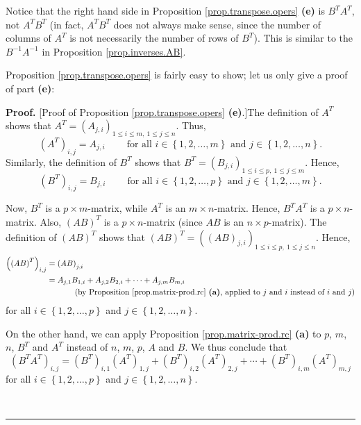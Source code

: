\documentclass[numbers=enddot,12pt,final,onecolumn,notitlepage]{scrartcl}%
\theoremstyle{definition}
\newenvironment{proof}[1][Proof]{\noindent\textbf{#1.} }{\ \rule{0.5em}{0.5em}}
\begin{document}
Notice that the right hand side in Proposition \ref{prop.transpose.opers}
\textbf{(e)} is $B^{T}A^{T}$, not $A^{T}B^{T}$ (in fact, $A^{T}B^{T}$ does not
always make sense, since the number of columns of $A^{T}$ is not necessarily
the number of rows of $B^{T}$). This is similar to the $B^{-1}A^{-1}$ in
Proposition \ref{prop.inverses.AB}.

Proposition \ref{prop.transpose.opers} is fairly easy to show; let us only
give a proof of part \textbf{(e)}:

\begin{proof}
[Proof of Proposition \ref{prop.transpose.opers} \textbf{(e)}.]The definition
of $A^{T}$ shows that $A^{T}=\left(  A_{j,i}\right)  _{1\leq i\leq m,\ 1\leq
j\leq n}$. Thus,%
\begin{equation}
\left(  A^{T}\right)  _{i,j}=A_{j,i}\ \ \ \ \ \ \ \ \ \ \text{for all }%
i\in\left\{  1,2,\ldots,m\right\}  \text{ and }j\in\left\{  1,2,\ldots
,n\right\}  . \label{pf.prop.transpose.opers.d.AT}%
\end{equation}
Similarly, the definition of $B^{T}$ shows that $B^{T}=\left(  B_{j,i}\right)
_{1\leq i\leq p,\ 1\leq j\leq m}$. Hence,%
\begin{equation}
\left(  B^{T}\right)  _{i,j}=B_{j,i}\ \ \ \ \ \ \ \ \ \ \text{for all }%
i\in\left\{  1,2,\ldots,p\right\}  \text{ and }j\in\left\{  1,2,\ldots
,m\right\}  . \label{pf.prop.transpose.opers.d.BT}%
\end{equation}


Now, $B^{T}$ is a $p\times m$-matrix, while $A^{T}$ is an $m\times n$-matrix.
Hence, $B^{T}A^{T}$ is a $p\times n$-matrix. Also, $\left(  AB\right)  ^{T}$
is a $p\times n$-matrix (since $AB$ is an $n\times p$-matrix). The definition
of $\left(  AB\right)  ^{T}$ shows that $\left(  AB\right)  ^{T}=\left(
\left(  AB\right)  _{j,i}\right)  _{1\leq i\leq p,\ 1\leq j\leq n}$. Hence,
\begin{align}
\left(  \left(  AB\right)  ^{T}\right)  _{i,j}  &  =\left(  AB\right)
_{j,i}\nonumber\\
&  =A_{j,1}B_{1,i}+A_{j,2}B_{2,i}+\cdots+A_{j,m}B_{m,i}%
\label{pf.prop.transpose.opers.d.1}\\
&  \ \ \ \ \ \ \ \ \ \ \left(  \text{by Proposition \ref{prop.matrix-prod.rc}
\textbf{(a)}, applied to }j\text{ and }i\text{ instead of }i\text{ and
}j\right) \nonumber
\end{align}
for all $i\in\left\{  1,2,\ldots,p\right\}  $ and $j\in\left\{  1,2,\ldots
,n\right\}  $.

On the other hand, we can apply Proposition \ref{prop.matrix-prod.rc}
\textbf{(a)} to $p$, $m$, $n$, $B^{T}$ and $A^{T}$ instead of $n$, $m$, $p$,
$A$ and $B$. We thus conclude that%
\begin{equation}
\left(  B^{T}A^{T}\right)  _{i,j}=\left(  B^{T}\right)  _{i,1}\left(
A^{T}\right)  _{1,j}+\left(  B^{T}\right)  _{i,2}\left(  A^{T}\right)
_{2,j}+\cdots+\left(  B^{T}\right)  _{i,m}\left(  A^{T}\right)  _{m,j}
\label{pf.prop.transpose.opers.d.2}%
\end{equation}
for all $i\in\left\{  1,2,\ldots,p\right\}  $ and $j\in\left\{  1,2,\ldots
,n\right\}  $.


\end{proof}
\end{document}
